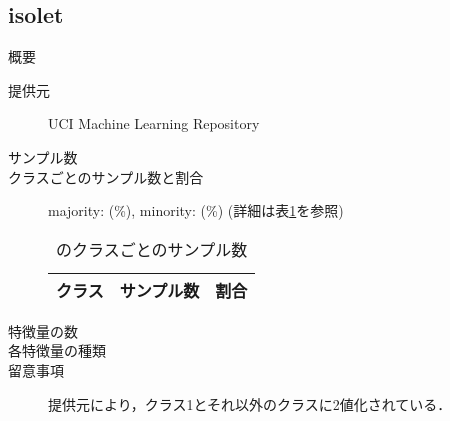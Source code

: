 \subsection{isolet}
\begin{description}
    \item[概要] \cite{}
    \item[提供元] UCI Machine Learning Repository
    \item[サンプル数] 
    \item[クラスごとのサンプル数と割合] majority:  (\%), minority:  (\%) (詳細は表\ref{tab:}を参照)

        \begin{table}[htbp]
            \centering
            \caption{のクラスごとのサンプル数}
            \label{tab:}
            \begin{tabular}{lrc} \hline
                \multicolumn{1}{c}{クラス}&
                \multicolumn{1}{c}{サンプル数}&
                \multicolumn{1}{c}{割合}\\
                \hline
                \hline

                \hline
            \end{tabular}
        \end{table}

    \item[特徴量の数] 
    \item[各特徴量の種類] \mbox{}
        
    \item[留意事項] 提供元により，クラス1とそれ以外のクラスに2値化されている．
\end{description}

